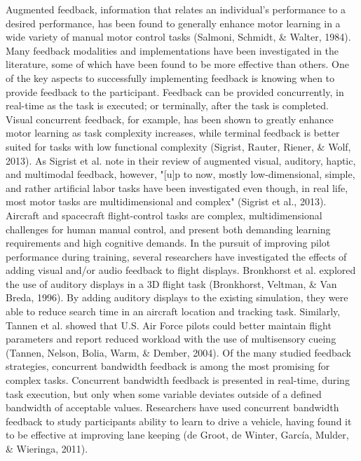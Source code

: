 Augmented feedback, information that relates an individual's performance to a desired performance, has been found to generally enhance motor learning in a wide variety of manual motor control tasks (Salmoni, Schmidt, \& Walter, 1984).
Many feedback modalities and implementations have been investigated in the literature, some of which have been found to be more effective than others.
One of the key aspects to successfully implementing feedback is knowing when to provide feedback to the participant.
Feedback can be provided concurrently, in real-time as the task is executed; or terminally, after the task is completed.
Visual concurrent feedback, for example, has been shown to greatly enhance motor learning as task complexity increases, while terminal feedback is better suited for tasks with low functional complexity (Sigrist, Rauter, Riener, \& Wolf, 2013).
As Sigrist et al. note in their review of augmented visual, auditory, haptic, and multimodal feedback, however, "[u]p to now, mostly low-dimensional, simple, and rather artificial labor tasks have been investigated even though, in real life, most motor tasks are multidimensional and complex" (Sigrist et al., 2013).
Aircraft and spacecraft flight-control tasks are complex, multidimensional challenges for human manual control, and present both demanding learning requirements and high cognitive demands.
In the pursuit of improving pilot performance during training, several researchers have investigated the effects of adding visual and/or audio feedback to flight displays.
Bronkhorst et al. explored the use of auditory displays in a 3D flight task (Bronkhorst, Veltman, \& Van Breda, 1996).
By adding auditory displays to the existing simulation, they were able to reduce search time in an aircraft location and tracking task.
Similarly, Tannen et al. showed that U.S. Air Force pilots could better maintain flight parameters and report reduced workload with the use of multisensory cueing (Tannen, Nelson, Bolia, Warm, \& Dember, 2004).
Of the many studied feedback strategies, concurrent bandwidth feedback is among the most promising for complex tasks.
Concurrent bandwidth feedback is presented in real-time, during task execution, but only when some variable deviates outside of a defined bandwidth of acceptable values.
Researchers have used concurrent bandwidth feedback to study participants ability to learn to drive a vehicle, having found it to be effective at improving lane keeping (de Groot, de Winter, García, Mulder, \& Wieringa, 2011).

